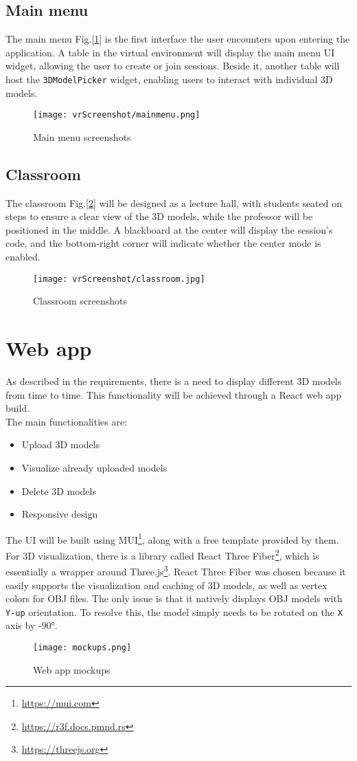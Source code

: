 \subsection{Main menu}
\noindent
The main menu Fig.[\ref{fig:mainmenuRoom}] is the first interface the user encounters upon entering the application. A table in the virtual environment will display the main menu \ac{UI} widget, allowing the user to create or join sessions.
Beside it, another table will host the \texttt{3DModelPicker} widget, enabling users to interact with individual 3D models.

\begin{figure}[ht]
    \centering
    \texttt{[image: vrScreenshot/mainmenu.png]}
    \caption{Main menu screenshots}
    \label{fig:mainmenuRoom}
\end{figure}
\subsection{Classroom}
\noindent
The classroom Fig.[\ref{fig:classroom}] will be designed as a lecture hall, with students seated on steps to ensure a clear view of the 3D models, while the professor will be positioned in the middle.
A blackboard at the center will display the session's code, and the bottom-right corner will indicate whether the center mode is enabled.

\begin{figure}[ht]
    \centering
    \texttt{[image: vrScreenshot/classroom.jpg]}
    \caption{Classroom screenshots}
    \label{fig:classroom}
\end{figure}

\section{Web app}
\noindent
As described in the requirements, there is a need to display different 3D models from time to time. This functionality will be achieved through a React web app build.\\
The main functionalities are:

\begin{itemize}
    \item Upload 3D models
    \item Visualize already uploaded models
    \item Delete 3D models
    \item Responsive design
\end{itemize}
\noindent
The \ac{UI} will be built using MUI\footnote{\url{https://mui.com}}, along with a free template provided by them.\\
For 3D visualization, there is a library called React Three Fiber\footnote{\url{https://r3f.docs.pmnd.rs}}, which is essentially a wrapper around Three.js\footnote{\url{https://threejs.org}}.
React Three Fiber was chosen because it easily supports the visualization and caching of 3D models, as well as vertex colors for OBJ files. The only issue is that it natively displays OBJ models with \texttt{Y-up} orientation. To resolve this, the model simply needs to be rotated on the \texttt{X} axis by -90°.

\begin{figure}[ht]
    \centering
    \texttt{[image: mockups.png]}
    \caption{Web app mockups}
    \label{fig:mockups}
\end{figure}